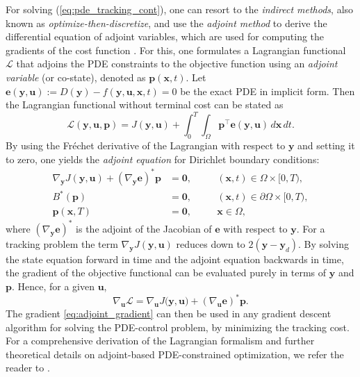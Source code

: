 \documentclass[final,1p,times]{elsarticle}
\theoremstyle{plain} %
\theoremstyle{definition} %
\theoremstyle{remark} %
\begin{document}
For solving (\ref{eq:pde_tracking_cont}), one can resort to the \textit{indirect methods}, also known as \textit{optimize-then-discretize}, and use the \textit{adjoint method} to derive the differential equation of adjoint variables, which are used for computing the gradients of the cost function \cite{Hinze2009OptimizationPDEConstraints,lions1971optimal}. For this, one formulates a Lagrangian functional $\mathcal{L}$ that adjoins the PDE constraints to the objective function using an \textit{adjoint variable} (or co-state), denoted as $\mathbf{p}(\mathbf{x},t)$. Let $\mathbf{e}(\mathbf{y},\mathbf{u}):=D(\mathbf{y})- f (\mathbf{y},\mathbf{u},\mathbf{x},t)=0$ be the exact PDE in implicit form. Then the Lagrangian functional without terminal cost can be stated as
\begin{equation}\label{eq:lagrangian}
\mathcal{L}(\mathbf{y}, \mathbf{u}, \mathbf{p}) = J(\mathbf{y}, \mathbf{u}) + \int_{0}^{T}\int_{\Omega} \mathbf{p}^{\top} \mathbf{e}(\mathbf{y},\mathbf{u})\,d\mathbf{x}\,dt.
\end{equation}
By using the Fréchet derivative of the Lagrangian with respect to $\mathbf{y}$ and setting it to zero, one yields the \textit{adjoint equation} for Dirichlet boundary conditions:
\begin{equation}\label{eq:adjoint}
\begin{aligned}
\nabla_\mathbf{y}J(\mathbf{y},\mathbf{u}) + (\nabla_{\mathbf{y}} \mathbf{e})^* \mathbf{p}&= \mathbf{0}, \quad &&(\mathbf{x},t)\in\Omega\times[0,T), \\
B^*(\mathbf{p}) &= \mathbf{0}, \quad &&(\mathbf{x},t)\in\partial\Omega\times[0,T), \\
\mathbf{p}(\mathbf{x}, T) &= \mathbf{0}, \quad &&\mathbf{x}\in\Omega,
\end{aligned}
\end{equation}
where $(\nabla_{\mathbf{y}} \mathbf{e})^*$ is the adjoint of the Jacobian of $\mathbf{e}$ with respect to $\mathbf{y}$. For a tracking problem the term $\nabla_\mathbf{y}J(\mathbf{y},\mathbf{u})$ reduces down to $2(\mathbf{y}-\mathbf{y}_d)$. By solving the state equation forward in time and the adjoint equation backwards in time, the gradient of the objective functional can be evaluated purely in terms of $\mathbf{y}$ and $\mathbf{p}$. Hence, for a given $\mathbf{u}$,  
\begin{equation}\label{eq:adjoint_gradient}
\nabla_{\mathbf{u}} \mathcal{L} = \nabla_{\mathbf{u}} J(\mathbf{y},\mathbf{u)} + (\nabla_{\mathbf{u}} \mathbf{e})^* \mathbf{p}.
\end{equation}
The gradient \eqref{eq:adjoint_gradient} can then be used in any gradient descent algorithm for solving the PDE-control problem, by minimizing the tracking cost. For a comprehensive derivation of the Lagrangian formalism and further theoretical details on adjoint-based PDE-constrained optimization, we refer the reader to \cite{Hinze2009OptimizationPDEConstraints, Troeltzsch2010OptimalControlPDE}.
\end{document}
